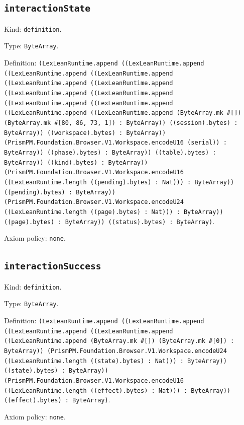 \documentclass[11pt]{article}
\begin{document}
\subsection*{\texttt{interactionState}}
\noindent Kind: \texttt{definition}.\par
\noindent Type: \texttt{ByteArray}.\par
\noindent Definition: \texttt{(LexLeanRuntime.append ((LexLeanRuntime.append ((LexLeanRuntime.append ((LexLeanRuntime.append ((LexLeanRuntime.append ((LexLeanRuntime.append ((LexLeanRuntime.append ((LexLeanRuntime.append ((LexLeanRuntime.append ((LexLeanRuntime.append ((LexLeanRuntime.append ((LexLeanRuntime.append (ByteArray.mk \#[]) (ByteArray.mk \#[80, 86, 73, 1]) : ByteArray)) ((session).bytes) : ByteArray)) ((workspace).bytes) : ByteArray)) (PrismPM.Foundation.Browser.V1.Workspace.encodeU16 (serial)) : ByteArray)) ((phase).bytes) : ByteArray)) ((table).bytes) : ByteArray)) ((kind).bytes) : ByteArray)) (PrismPM.Foundation.Browser.V1.Workspace.encodeU16 ((LexLeanRuntime.length ((pending).bytes) : Nat))) : ByteArray)) ((pending).bytes) : ByteArray)) (PrismPM.Foundation.Browser.V1.Workspace.encodeU24 ((LexLeanRuntime.length ((page).bytes) : Nat))) : ByteArray)) ((page).bytes) : ByteArray)) ((status).bytes) : ByteArray)}.\par
\noindent Axiom policy: \texttt{none}.\par
\subsection*{\texttt{interactionSuccess}}
\noindent Kind: \texttt{definition}.\par
\noindent Type: \texttt{ByteArray}.\par
\noindent Definition: \texttt{(LexLeanRuntime.append ((LexLeanRuntime.append ((LexLeanRuntime.append ((LexLeanRuntime.append ((LexLeanRuntime.append (ByteArray.mk \#[]) (ByteArray.mk \#[0]) : ByteArray)) (PrismPM.Foundation.Browser.V1.Workspace.encodeU24 ((LexLeanRuntime.length ((state).bytes) : Nat))) : ByteArray)) ((state).bytes) : ByteArray)) (PrismPM.Foundation.Browser.V1.Workspace.encodeU16 ((LexLeanRuntime.length ((effect).bytes) : Nat))) : ByteArray)) ((effect).bytes) : ByteArray)}.\par
\noindent Axiom policy: \texttt{none}.\par
\end{document}
